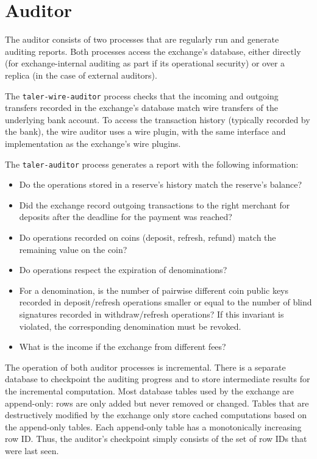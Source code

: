\section{Auditor}
The auditor consists of two processes that are regularly run and generate
auditing reports.  Both processes access the exchange's database, either
directly (for exchange-internal auditing as part if its operational security)
or over a replica (in the case of external auditors).

The \texttt{taler-wire-auditor} process checks that the incoming and outgoing
transfers recorded in the exchange's database match wire transfers of the
underlying bank account.  To access the transaction history (typically recorded
by the bank), the wire auditor uses a wire plugin, with the same interface and
implementation as the exchange's wire plugins.

The \texttt{taler-auditor} process generates a report with the following information:
\begin{itemize}
  \item Do the operations stored in a reserve's history match the reserve's balance?
  \item Did the exchange record outgoing transactions to the right merchant for
    deposits after the deadline for the payment was reached?
  \item Do operations recorded on coins (deposit, refresh, refund) match the remaining
    value on the coin?
  \item Do operations respect the expiration of denominations?
  \item For a denomination, is the number of pairwise different coin public
    keys recorded in deposit/refresh operations smaller or equal to the number
    of blind signatures recorded in withdraw/refresh operations?
    If this invariant is violated, the corresponding denomination must be revoked.
  \item What is the income if the exchange from different fees?
\end{itemize}

The operation of both auditor processes is incremental.  There is a separate
database to checkpoint the auditing progress and to store intermediate results
for the incremental computation.  Most database tables used by the exchange are
append-only:  rows are only added but never removed or changed.  Tables that
are destructively modified by the exchange only store cached computations based
on the append-only tables.  Each append-only table has a monotonically
increasing row ID.  Thus, the auditor's checkpoint simply consists of the set of
row IDs that were last seen.

